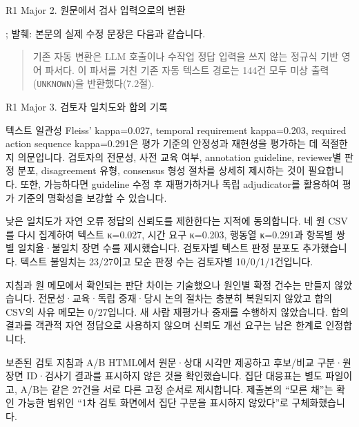 \begin{reviewitem}{R1 Major 2. 원문에서 검사 입력으로의 변환}
\begin{authorresponse}
\end{authorresponse}

\begin{manuscriptrevision}{; 발췌: }
본문의 실제 수정 문장은 다음과 같습니다.

\begin{quote}
기존 자동 변환은 LLM 호출이나 수작업 정답 입력을 쓰지 않는 정규식 기반 영어 파서다. 이 파서를 거친 기존 자동 텍스트 경로는 144건 모두 미상 출력(\texttt{UNKNOWN})을 반환했다(7.2절).
\end{quote}
\end{manuscriptrevision}

\end{reviewitem}

\clearpage

\begin{reviewitem}{R1 Major 3. 검토자 일치도와 합의 기록}

\begin{reviewercomment}

텍스트 일관성 Fleiss' kappa=0.027, temporal requirement kappa=0.203, required action sequence kappa=0.291은 평가 기준의 안정성과 재현성을 평가하는 데 적절한지 의문입니다. 검토자의 전문성, 사전 교육 여부, annotation guideline, reviewer별 판정 분포, disagreement 유형, consensus 형성 절차를 상세히 제시하는 것이 필요합니다. 또한, 가능하다면 guideline 수정 후 재평가하거나 독립 adjudicator를 활용하여 평가 기준의 명확성을 보강할 수 있습니다.

\end{reviewercomment}

\begin{authorresponse}

낮은 일치도가 자연 오류 정답의 신뢰도를 제한한다는 지적에 동의합니다. 네 원 CSV를 다시 집계하여 텍스트 κ=0.027, 시간 요구 κ=0.203, 행동열 κ=0.291과 항목별 쌍별 일치율·불일치 장면 수를 제시했습니다. 검토자별 텍스트 판정 분포도 추가했습니다. 텍스트 불일치는 23/27이고 모순 판정 수는 검토자별 10/0/1/1건입니다.

지침과 원 메모에서 확인되는 판단 차이는 기술했으나 원인별 확정 건수는 만들지 않았습니다. 전문성·교육·독립 중재·당시 논의 절차는 충분히 복원되지 않았고 합의 CSV의 사유 메모는 0/27입니다. 새 사람 재평가나 중재를 수행하지 않았습니다. 합의 결과를 객관적 자연 정답으로 사용하지 않으며 신뢰도 개선 요구는 남은 한계로 인정합니다.

보존된 검토 지침과 A/B HTML에서 원문·상대 시각만 제공하고 후보/비교 구분·원 장면 ID·검사기 결과를 표시하지 않은 것을 확인했습니다. 집단 대응표는 별도 파일이고, A/B는 같은 27건을 서로 다른 고정 순서로 제시합니다. 제출본의 ``모른 채''는 확인 가능한 범위인 ``1차 검토 화면에서 집단 구분을 표시하지 않았다''로 구체화했습니다.


\end{authorresponse}
\end{reviewitem}
